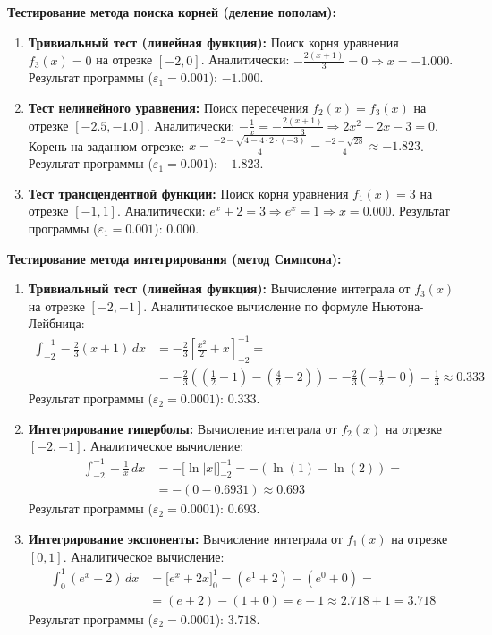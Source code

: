\documentclass[a4paper,12pt,titlepage,final]{article}
\begin{document}
\textbf{Тестирование метода поиска корней (деление пополам):}
\begin{enumerate}
    \item \textbf{Тривиальный тест (линейная функция):} Поиск корня уравнения $f_3(x) = 0$ на отрезке $[-2, 0]$.
    Аналитически: $-\frac{2(x + 1)}{3} = 0 \Rightarrow x = -1.000$.
    Результат программы ($\varepsilon_1=0.001$): $-1.000$.
    
    \item \textbf{Тест нелинейного уравнения:} Поиск пересечения $f_2(x) = f_3(x)$ на отрезке $[-2.5, -1.0]$.
    Аналитически: $-\frac{1}{x} = -\frac{2(x+1)}{3} \Rightarrow 2x^2 + 2x - 3 = 0$.
    Корень на заданном отрезке: $x = \frac{-2 - \sqrt{4 - 4\cdot 2 \cdot (-3)}}{4} = \frac{-2 - \sqrt{28}}{4} \approx -1.823$.
    Результат программы ($\varepsilon_1=0.001$): $-1.823$.
    
    \item \textbf{Тест трансцендентной функции:} Поиск корня уравнения $f_1(x) = 3$ на отрезке $[-1, 1]$.
    Аналитически: $e^x + 2 = 3 \Rightarrow e^x = 1 \Rightarrow x = 0.000$.
    Результат программы ($\varepsilon_1=0.001$): $0.000$.
\end{enumerate}

\textbf{Тестирование метода интегрирования (метод Симпсона):}
\begin{enumerate}
    \item \textbf{Тривиальный тест (линейная функция):} Вычисление интеграла от $f_3(x)$ на отрезке $[-2, -1]$.
    Аналитическое вычисление по формуле Ньютона-Лейбница:
    \begin{align*}
    \int_{-2}^{-1} -\frac{2}{3}(x+1) \, dx &= -\frac{2}{3} \left[ \frac{x^2}{2} + x \right]_{-2}^{-1} = \\
    &= -\frac{2}{3} \left( \left(\frac{1}{2} - 1\right) - \left(\frac{4}{2} - 2\right) \right) = -\frac{2}{3} \left( -\frac{1}{2} - 0 \right) = \frac{1}{3} \approx 0.333
    \end{align*}
    Результат программы ($\varepsilon_2=0.0001$): $0.333$.

    \item \textbf{Интегрирование гиперболы:} Вычисление интеграла от $f_2(x)$ на отрезке $[-2, -1]$.
    Аналитическое вычисление:
    \begin{align*}
    \int_{-2}^{-1} -\frac{1}{x} \, dx &= -\Big[ \ln|x| \Big]_{-2}^{-1} = -(\ln(1) - \ln(2)) = \\
    &= -(0 - 0.6931) \approx 0.693
    \end{align*}
    Результат программы ($\varepsilon_2=0.0001$): $0.693$.

    \item \textbf{Интегрирование экспоненты:} Вычисление интеграла от $f_1(x)$ на отрезке $[0, 1]$.
    Аналитическое вычисление:
    \begin{align*}
    \int_{0}^{1} (e^x + 2) \, dx &= \Big[ e^x + 2x \Big]_{0}^{1} = (e^1 + 2) - (e^0 + 0) = \\
    &= (e + 2) - (1 + 0) = e + 1 \approx 2.718 + 1 = 3.718
    \end{align*}
    Результат программы ($\varepsilon_2=0.0001$): $3.718$.
\end{enumerate}
\end{document}
